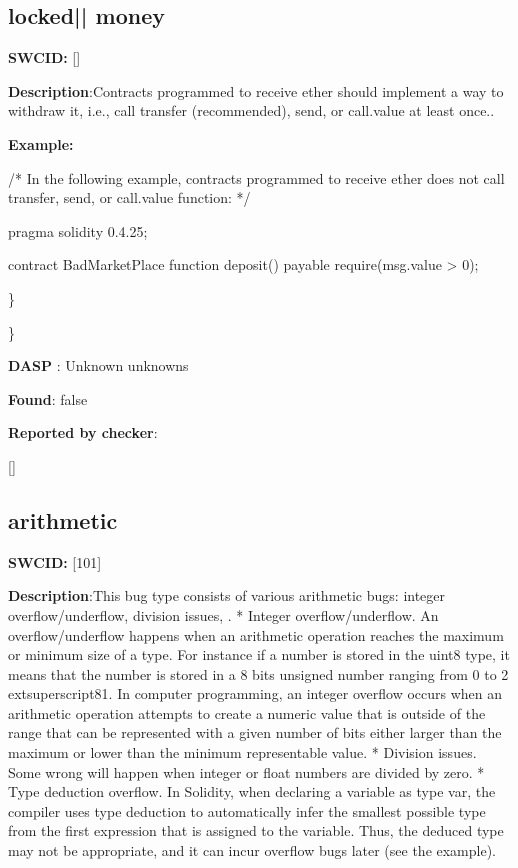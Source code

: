 \documentclass{article}
\begin{document}
\subsection{locked{|\textunderscore| }money} 
\textbf{SWC{\textunderscore }ID:} []

\textbf{Description}:Contracts programmed to receive ether should implement a way to withdraw it, i.e., call transfer (recommended), send, or call.value at least once..


\textbf{Example:} 
\begin{ffcode} 

/* In the following example, contracts programmed to receive ether does not call transfer, send, or call.value function: */ 

pragma solidity 0.4.25;

contract BadMarketPlace {
    function deposit() payable {
        require(msg.value > 0);
    }
}

\end{ffcode} 
\} 

\} 

\textbf{DASP} : Unknown unknowns

\textbf{Found}: false

\textbf{Reported by checker}: 
\begin{ffcode} 

[]
\end{ffcode} 
\subsection{arithmetic} 
\textbf{SWC{\textunderscore }ID:} [101]

\textbf{Description}:This bug type consists of various arithmetic bugs: integer overflow/underflow, division issues, .
* Integer overflow/underflow. An overflow/underflow happens when an arithmetic operation reaches the maximum or minimum size of a type. For instance if a number is stored in the uint8 type, it means that the number is stored in a 8 bits unsigned number ranging from 0 to 2{	extsuperscript}8{\textendash}1. In computer programming, an integer overflow occurs when an arithmetic operation attempts to create a numeric value that is outside of the range that can be represented with a given number of bits either larger than the maximum or lower than the minimum representable value.
* Division issues. Some wrong will happen when integer or float numbers are divided by zero.
* Type deduction overflow. In Solidity, when declaring a variable as type var, the compiler uses type deduction to automatically infer the smallest possible type from the first expression that is assigned to the variable. Thus, the deduced type may not be appropriate, and it can incur overflow bugs later (see the example).
\end{document}
